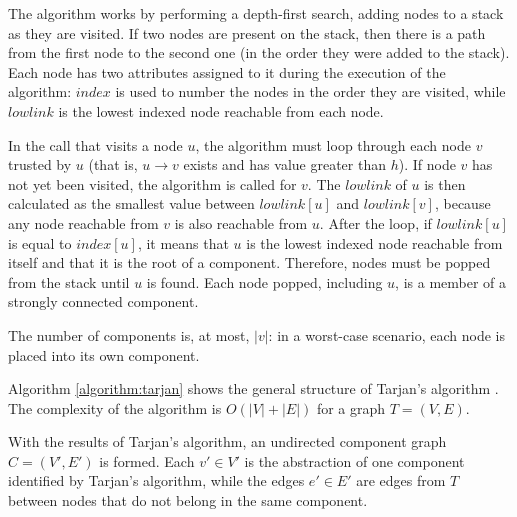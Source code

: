 \documentclass[conference]{IEEEtran}
\begin{document}



The algorithm works by performing a depth-first search, adding nodes to a stack as they are visited.
If two nodes are present on the stack, then there is a path from the first node to the second one (in the order they were added to the stack).
Each node has two attributes assigned to it during the execution of the algorithm: $index$ is used to number the nodes in the order they are visited, while $lowlink$ is the lowest indexed node reachable from each node.

In the call that visits a node $u$, the algorithm must loop through each node $v$ trusted by $u$ (that is, $u \rightarrow v$ exists and has value greater than $h$).
If node $v$ has not yet been visited, the algorithm is called for  $v$.
The $lowlink$ of $u$ is then calculated as the smallest value between $lowlink[u]$ and $lowlink[v]$, because any node reachable from $v$ is also reachable from $u$.
After the loop, if $lowlink[u]$ is equal to $index[u]$, it means that $u$ is the lowest indexed node reachable from itself and that it is the root of a component.
Therefore, nodes must be popped from the stack until $u$ is found.
Each node popped, including $u$, is a member of a strongly connected component.


The number of components is, at most, $|v|$: in a worst-case scenario, each node is placed into its own component.

Algorithm \autoref{algorithm:tarjan} shows the general structure of Tarjan's algorithm  \cite{tarjan1972depth}.
The complexity of the algorithm is $O(|V|+|E|)$ for a graph $T = (V,E)$.

With the results of Tarjan's algorithm, an undirected component graph $C = (V',E')$ is formed.
Each $v' \in V'$ is the abstraction of one component identified by Tarjan's algorithm, while the edges $e' \in E'$ are edges from $T$ between nodes that do not belong in the same component.
\end{document}

